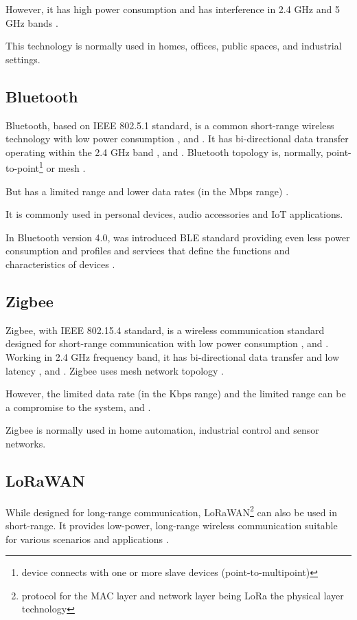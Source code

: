However, it has high power consumption and has interference in 2.4 GHz and 5 GHz bands \cite{WCOM8}.

This technology is normally used in homes, offices, public spaces, and industrial settings.

\subsection{Bluetooth}
Bluetooth,  based on \gls{IEEE} 802.5.1 standard, is a common short-range wireless technology with low power consumption \cite{WCOM8}, \cite{WCOM11} and \cite{WCOM12}.
It has bi-directional data transfer operating within the 2.4 GHz band \cite{WCOM8}, \cite{WCOM11} and \cite{WCOM12}.
Bluetooth topology is, normally, point-to-point\footnote{device connects with one or more slave devices (point-to-multipoint)} or mesh \cite{WCOM8}.

But has a limited range and lower data rates (in the Mbps range) \cite{WCOM8}.

It is commonly used in personal devices, audio accessories and \gls{IoT} applications.

In Bluetooth version 4.0, was introduced \gls{BLE} standard providing even less power consumption and profiles and services that define the functions and characteristics of devices \cite{WCOM8}.

\subsection{Zigbee}
Zigbee, with \gls{IEEE} 802.15.4 standard, is a wireless communication standard designed for short-range communication with low power consumption \cite{WCOM8}, \cite{WCOM11} and \cite{WCOM12}.
Working in 2.4 GHz frequency band, it has bi-directional data transfer and low latency \cite{WCOM8}, \cite{WCOM11} and \cite{WCOM12}.
Zigbee uses mesh network topology \cite{WCOM8}.

However, the limited data rate (in the Kbps range) and the limited range can be a compromise to the system, \cite{WCOM11} and \cite{WCOM12}.

Zigbee is normally used in home automation, industrial control and sensor networks.

\subsection{LoRaWAN}
While designed for long-range communication, \gls{LoRaWAN}\footnote{protocol for the MAC layer and network layer being LoRa the physical layer technology} can also be used in short-range.
It provides low-power, long-range wireless communication suitable for various scenarios and applications \cite{WCOM8}.

